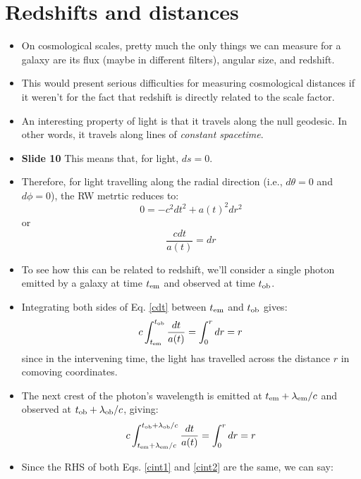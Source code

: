 \documentclass[11pt]{article}
\begin{document}
\section{Redshifts and distances}
\begin{itemize}
\item On cosmological scales, pretty much the only things we can measure for a galaxy are its flux (maybe in different filters), angular size, and redshift.
\item This would present serious difficulties for measuring cosmological distances if it weren't for the fact that redshift is directly related to the scale factor.
\item An interesting property of light is that it travels along the null geodesic. In other words, it travels along lines of {\it constant spacetime}.
\item {\bf Slide 10} This means that, for light, $ds = 0$.
\item Therefore, for light travelling along the radial direction (i.e., $d\theta=0$ and $d\phi=0$), the RW metrtic reduces to:
\begin{equation}
    0 = -c^2dt^2+a(t)^2dr^2
\end{equation}
or
\begin{equation}
    \label{cdt}
    \frac{cdt}{a(t)}=dr
\end{equation}
\item To see how this can be related to redshift, we'll consider a single photon emitted by a galaxy at time $t_{\rm em}$ and observed at time $t_{\rm ob}$.
\item Integrating both sides of Eq. \ref{cdt} between $t_{\rm em}$ and $t_{\rm ob}$ gives:
\begin{equation}
    \label{cint1}
    c\int_{t_{\rm em}}^{t_{\rm ob}}\frac{dt}{a(t)}=\int_0^r dr=r
\end{equation}
since in the intervening time, the light has travelled across the distance $r$ in comoving coordinates.
\item The next crest of the photon's wavelength is emitted at $t_{\rm em}+\lambda_{\rm em}/c$ and observed at $t_{\rm ob}+\lambda_{\rm ob}/c$, giving:
\begin{equation}
    \label{cint2}
    c\int_{t_{\rm em}+\lambda_{\rm em}/c}^{t_{\rm ob}+\lambda_{\rm ob}/c}\frac{dt}{a(t)}=\int_0^r dr=r
\end{equation}
\item Since the RHS of both Eqs. \ref{cint1} and \ref{cint2} are the same, we can say:
\begin{equation}

\end{equation}
\end{itemize}
\end{document}
